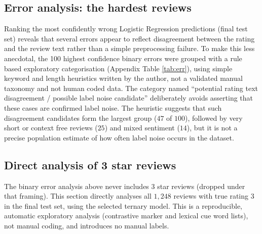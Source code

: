 \documentclass[11pt,a4paper,DIV=12]{scrartcl}
\begin{document}
\subsection{Error analysis: the hardest reviews}
Ranking the most confidently wrong Logistic Regression predictions (final test
set) reveals that several errors appear to reflect disagreement between the
rating and the review text rather than a simple preprocessing failure. To make
this less anecdotal, the 100 highest confidence binary errors were grouped with
a rule based exploratory categorisation (Appendix Table
\ref{tab:err}), using simple keyword and length heuristics written by the author, not a
validated manual taxonomy and not human coded data. The category named
``potential rating text disagreement / possible label noise candidate''
deliberately avoids asserting that these cases are confirmed label noise. The
heuristic suggests that such disagreement candidates form the largest group
($47$ of $100$), followed by very short or context free reviews ($25$) and mixed
sentiment ($14$), but it is not a precise population estimate of how often label
noise occurs in the dataset.

\subsection{Direct analysis of 3 star reviews}
\label{sec:rq1-3star}
The binary error analysis above never includes 3 star reviews (dropped under
that framing). This section directly analyses all $1{,}248$ reviews with true
rating 3 in the final test set, using the selected ternary model. This is a
reproducible, automatic exploratory analysis (contrastive marker and
lexical cue word lists), not manual coding, and introduces no manual labels.
\end{document}
